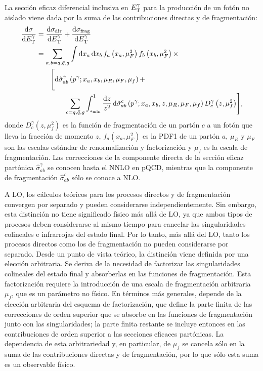 La sección eficaz diferencial inclusiva en \(E_{\text{T}}^{\gamma}\) para la producción de un fotón no aislado viene dada por la suma de las contribuciones directas y de fragmentación:
\begin{align}
    \dv{\sigma}{\ensuremath{E_{\text{T}}^{\gamma}}} &= \dv{\sigma_{\text{dir}}}{\ensuremath{E_{\text{T}}^{\gamma}}} + \dv{\sigma_{\text{frag}}}{\ensuremath{E_{\text{T}}^{\gamma}}} \nonumber\\
    &= \sum_{a,b=q,\bar{q},g} \int \dd{x_a} \dd{x_b} f_a\left(x_a, \mu_F^2\right) f_b\left(x_b, \mu_F^2\right) \times \nonumber\\
    &\quad\quad
    \Biggl[
        \dd{\hat{\sigma}^{\gamma}_{ab} \left(p^{\gamma}; x_a, x_b, \mu_R, \mu_F, \mu_f\right)}
        + \nonumber\\
    &\quad\quad\quad\quad
    \sum_{c=q,\bar{q}, g} \int_{z_{\min}}^{1} \frac{\dd{z}}{z^2} \dd{\hat{\sigma}^c_{ab} \left(p^{\gamma}; x_a, x_b, z, \mu_R, \mu_F, \mu_f\right)} D_c^{\gamma} \left(z, \mu_f^2\right)
    \Biggr],
\end{align}
donde \(D_c^{\gamma} \left(z,\mu_f^2\right)\) es la función de fragmentación de un partón \(c\) a un fotón que lleva la fracción de momento \(z\), \(f_a \left(x_a, \mu^2_F \right)\) es la \ac{PDF1} de un partón \(a\), \(\mu_R\) y \(\mu_F\) son las escalas estándar de renormalización y factorización y \(\mu_f\) es la escala de fragmentación. Las correcciones de la componente directa de la sección eficaz partónica \(\hat{\sigma}^{\gamma}_{ab}\) se conocen hasta el \ac{NNLO} en \ac{pQCD}, mientras que la componente de fragmentación \(\hat{\sigma}^c_{ab}\) sólo se conoce a \ac{NLO}.

A \ac{LO}, los cálculos teóricos para los procesos directos y de fragmentación convergen por separado y pueden considerarse independientemente. Sin embargo, esta distinción no tiene significado físico más allá de \ac{LO}, ya que ambos tipos de procesos deben considerarse al mismo tiempo para cancelar las singularidades colineales e infrarrojas del estado final. Por lo tanto, más allá del \ac{LO}, tanto los procesos directos como los de fragmentación no pueden considerarse por separado. Desde un punto de vista teórico, la distinción viene definida por una elección arbitraria. Se deriva de la necesidad de factorizar las singularidades colineales del estado final y absorberlas en las funciones de fragmentación. Esta factorización requiere la introducción de una escala de fragmentación arbitraria \(\mu_f\), que es un parámetro no físico. En términos más generales, depende de la elección arbitraria del esquema de factorización, que define la parte finita de las correcciones de orden superior que se absorbe en las funciones de fragmentación junto con las singularidades; la parte finita restante se incluye entonces en las contribuciones de orden superior a las secciones eficaces partónicas. La dependencia de esta arbitrariedad y, en particular, de \(\mu_f\) se cancela sólo en la suma de las contribuciones directas y de fragmentación, por lo que sólo esta suma es un observable físico.






